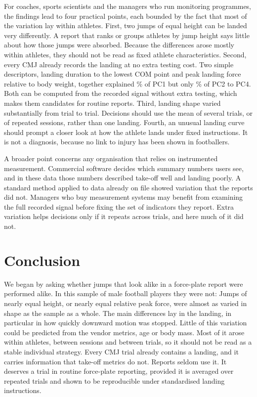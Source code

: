 For coaches, sports scientists and the managers who run monitoring programmes, the findings lead to four practical points, each bounded by the fact that most of the variation lay within athletes. First, two jumps of equal height can be landed very differently. A report that ranks or groups athletes by jump height says little about how those jumps were absorbed. Because the differences arose mostly within athletes, they should not be read as fixed athlete characteristics. Second, every CMJ already records the landing at no extra testing cost. Two simple descriptors, landing duration to the lowest COM point and peak landing force relative to body weight, together explained \landRtwoPCA\% of PC1 but only \landRtwoOtherRange\% of PC2 to PC4. Both can be computed from the recorded signal without extra testing, which makes them candidates for routine reports. Third, landing shape varied substantially from trial to trial. Decisions should use the mean of several trials, or of repeated sessions, rather than one landing. Fourth, an unusual landing curve should prompt a closer look at how the athlete lands under fixed instructions. It is not a diagnosis, because no link to injury has been shown in footballers.

A broader point concerns any organisation that relies on instrumented measurement. Commercial software decides which summary numbers users see, and in these data those numbers described take-off well and landing poorly. A standard method applied to data already on file showed variation that the reports did not. Managers who buy measurement systems may benefit from examining the full recorded signal before fixing the set of indicators they report. Extra variation helps decisions only if it repeats across trials, and here much of it did not.

\section{Conclusion}
\label{sec:conclusion}

We began by asking whether jumps that look alike in a force-plate report were performed alike. In this sample of male football players they were not: Jumps of nearly equal height, or nearly equal relative peak force, were almost as varied in shape as the sample as a whole. The main differences lay in the landing, in particular in how quickly downward motion was stopped. Little of this variation could be predicted from the vendor metrics, age or body mass. Most of it arose within athletes, between sessions and between trials, so it should not be read as a stable individual strategy. Every CMJ trial already contains a landing, and it carries information that take-off metrics do not. Reports seldom use it. It deserves a trial in routine force-plate reporting, provided it is averaged over repeated trials and shown to be reproducible under standardised landing instructions.

